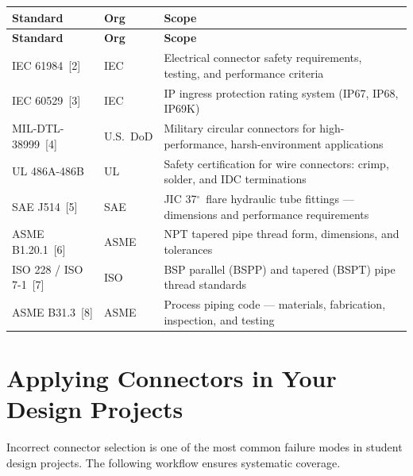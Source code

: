 \documentclass[11pt,letterpaper,twoside,openany]{book}
\begin{document}
\begin{longtable}{l l p{7.5cm}}
  \toprule
  \textbf{Standard} & \textbf{Org} & \textbf{Scope} \\
  \midrule
  \endfirsthead
  \toprule
  \textbf{Standard} & \textbf{Org} & \textbf{Scope} \\
  \midrule
  \endhead
  IEC 61984~[2] & IEC & Electrical connector safety requirements, testing, and performance criteria \\
  IEC 60529~[3] & IEC & IP ingress protection rating system (IP67, IP68, IP69K) \\
  MIL-DTL-38999~[4] & U.S.\ DoD & Military circular connectors for high-performance, harsh-environment applications \\
  UL 486A-486B & UL & Safety certification for wire connectors: crimp, solder, and IDC terminations \\
  SAE J514~[5] & SAE & JIC 37$^{\circ}$\ flare hydraulic tube fittings --- dimensions and performance requirements \\
  ASME B1.20.1~[6] & ASME & NPT tapered pipe thread form, dimensions, and tolerances \\
  ISO 228 / ISO 7-1~[7] & ISO & BSP parallel (BSPP) and tapered (BSPT) pipe thread standards \\
  ASME B31.3~[8] & ASME & Process piping code --- materials, fabrication, inspection, and testing \\
  \bottomrule
\end{longtable}


\FloatBarrier
\section{Applying Connectors in Your Design Projects}

Incorrect connector selection is one of the most common failure modes in student design projects. The following workflow ensures systematic coverage.
\end{document}
